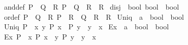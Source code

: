 \begin{isabellebody}
\ \ \ and{\isacharunderscore}{\kern0pt}def{\isacharcolon}{\kern0pt}\ {\isachardoublequoteopen}P\ {\isasymand}\ Q\ {\isasymequiv}\ {\isasymforall}R{\isachardot}{\kern0pt}\ {\isacharparenleft}{\kern0pt}P\ {\isasymlongrightarrow}\ Q\ {\isasymlongrightarrow}\ R{\isacharparenright}{\kern0pt}\ {\isasymlongrightarrow}\ R{\isachardoublequoteclose}\isanewline
\isanewline
{}\isamarkupfalse%
\ disj\ {\isacharcolon}{\kern0pt}{\isacharcolon}{\kern0pt}\ {\isachardoublequoteopen}{\isacharbrackleft}{\kern0pt}bool{\isacharcomma}{\kern0pt}\ bool{\isacharbrackright}{\kern0pt}\ {\isasymRightarrow}\ bool{\isachardoublequoteclose}\ \ {\isacharparenleft}{\kern0pt}\ {\isachardoublequoteopen}{\isasymor}{\isachardoublequoteclose}\ {}{}{\isacharparenright}{\kern0pt}\isanewline
\ \ \ or{\isacharunderscore}{\kern0pt}def{\isacharcolon}{\kern0pt}\ {\isachardoublequoteopen}P\ {\isasymor}\ Q\ {\isasymequiv}\ {\isasymforall}R{\isachardot}{\kern0pt}\ {\isacharparenleft}{\kern0pt}P\ {\isasymlongrightarrow}\ R{\isacharparenright}{\kern0pt}\ {\isasymlongrightarrow}\ {\isacharparenleft}{\kern0pt}Q\ {\isasymlongrightarrow}\ R{\isacharparenright}{\kern0pt}\ {\isasymlongrightarrow}\ R{\isachardoublequoteclose}\isanewline
\isanewline
{}\isamarkupfalse%
\ Uniq\ {\isacharcolon}{\kern0pt}{\isacharcolon}{\kern0pt}\ {\isachardoublequoteopen}{\isacharparenleft}{\kern0pt}{\isacharprime}{\kern0pt}a\ {\isasymRightarrow}\ bool{\isacharparenright}{\kern0pt}\ {\isasymRightarrow}\ bool{\isachardoublequoteclose}\isanewline
\ \ \ {\isachardoublequoteopen}Uniq\ P\ {\isasymequiv}\ {\isacharparenleft}{\kern0pt}{\isasymforall}x\ y{\isachardot}{\kern0pt}\ P\ x\ {\isasymlongrightarrow}\ P\ y\ {\isasymlongrightarrow}\ y\ {\isacharequal}{\kern0pt}\ x{\isacharparenright}{\kern0pt}{\isachardoublequoteclose}\isanewline
\isanewline
{}\isamarkupfalse%
\ Ex{}\ {\isacharcolon}{\kern0pt}{\isacharcolon}{\kern0pt}\ {\isachardoublequoteopen}{\isacharparenleft}{\kern0pt}{\isacharprime}{\kern0pt}a\ {\isasymRightarrow}\ bool{\isacharparenright}{\kern0pt}\ {\isasymRightarrow}\ bool{\isachardoublequoteclose}\isanewline
\ \ \ {\isachardoublequoteopen}Ex{}\ P\ {\isasymequiv}\ {\isasymexists}x{\isachardot}{\kern0pt}\ P\ x\ {\isasymand}\ {\isacharparenleft}{\kern0pt}{\isasymforall}y{\isachardot}{\kern0pt}\ P\ y\ {\isasymlongrightarrow}\ y\ {\isacharequal}{\kern0pt}\ x{\isacharparenright}{\kern0pt}{\isachardoublequoteclose}%
\isadelimdocument

\end{isabellebody}
